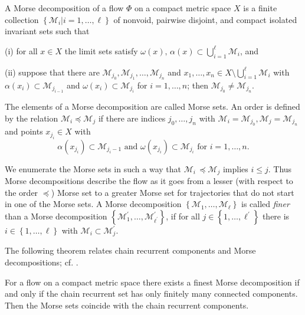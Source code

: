 	\begin{definition}
		\label{defMorsedecomp}A Morse decomposition of a flow $\Phi$ on a compact
		metric space $X$ is a finite collection $\left\{  \mathcal{M}_{i}\left\vert
		i=1,\ldots,\ell\right.  \right\}  $ of nonvoid, pairwise disjoint, and compact
		isolated invariant sets such that
		
		(i) for all $x\in X$ the limit sets satisfy $\omega(x),\,\alpha(x)\subset
		\bigcup_{i=1}^{\ell}\mathcal{M}_{i}$, and
		
		(ii) suppose that there are $\mathcal{M}_{j_{0}},\mathcal{M}_{j_{1}}%
		,\ldots,\mathcal{M}_{j_{n}}$ and $x_{1},\ldots,x_{n}\in X\setminus
		\bigcup_{i=1}^{\ell}\mathcal{M}_{i}$ with $\alpha(x_{i})\subset\mathcal{M}%
		_{j_{i-1}}$ and $\omega(x_{i})\subset\mathcal{M}_{j_{i}}$ for $i=1,\ldots,n$;
		then $\mathcal{M}_{j_{0}}\neq\mathcal{M}_{j_{n}}$.
		
		The elements of a Morse decomposition are called Morse sets. An order is
		defined by the relation $\mathcal{M}_{i}\preceq\mathcal{M}_{j}$ if there are
		indices $j_{0},\ldots,j_{n}$ with $\mathcal{M}_{i}=\mathcal{M}_{j_{0}
		},\mathcal{M}_{j}=\mathcal{M}_{j_{n}}$ and points $x_{j_{i}}\in X$ with
		\[
		\alpha(x_{j_{i}})\subset\mathcal{M}_{j_{i}-1}\mbox{ and }\omega(x_{j_{i}
		})\subset\mathcal{M}_{j_{i}}\mbox{ for }i=1,\ldots,n.
		\]
		
	\end{definition}
	
	We enumerate the Morse sets in such a way that $\mathcal{M}_{i}\,\preceq
	\mathcal{M}_{j}$ implies $i\leq j$. Thus Morse decompositions describe the
	flow as it goes from a lesser (with respect to the order $\preceq$) Morse set
	to a greater Morse set for trajectories that do not start in one of the Morse
	sets. A Morse decomposition $\left\{  \mathcal{M}_{1},\ldots,\mathcal{M}%
	_{\ell}\right\}  $ is called \textit{finer} than a Morse decomposition
	$\left\{  \mathcal{M}_{1}^{\prime},\ldots,\mathcal{M}_{\ell^{\prime}}^{\prime
	}\right\}  $, if for all $j\in\left\{  1,\ldots,\ell^{\prime}\right\}  $ there
	is $i\in\left\{  1,\ldots,\ell\right\}  $ with $\mathcal{M}_{i}\subset
	\mathcal{M}_{j}^{\prime}$.
	
	The following theorem relates chain recurrent components and Morse
	decompositions; cf. \cite[Theorem 8.3.3]{ColK14}.
	
	\begin{theorem}
		For a flow on a compact metric space there exists a finest Morse decomposition
		if and only if the chain recurrent set has only finitely many connected
		components. Then the Morse sets coincide with the chain recurrent components.
	\end{theorem}
	
